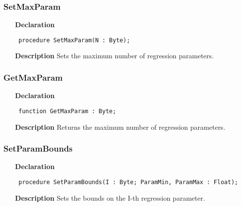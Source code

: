 \documentclass[12pt,a4paper,oneside]{report}
\newcommand{\declarationitem}[1]{\textbf{#1}}
\newcommand{\descriptiontitle}[1]{\textbf{#1}}
\newcommand{\code}[1]{\texttt{#1}}
\begin{document}
\subsubsection{SetMaxParam}
\label{unlfit-SetMaxParam}
\begin{itemize}\item[\declarationitem{Declaration}\hfill]
	\begin{flushleft}
		\code{
			procedure SetMaxParam(N : Byte);}
		
	\end{flushleft}
	
	\par
	\item[\descriptiontitle{Description}]
	Sets the maximum number of regression parameters.
	
\end{itemize}
\subsubsection{GetMaxParam}
\label{unlfit-GetMaxParam}
\begin{itemize}\item[\declarationitem{Declaration}\hfill]
	\begin{flushleft}
		\code{
			function GetMaxParam : Byte;}
		
	\end{flushleft}
	
	\par
	\item[\descriptiontitle{Description}]
	Returns the maximum number of regression parameters.
	
\end{itemize}
\subsubsection{SetParamBounds}
\label{unlfit-SetParamBounds}
\begin{itemize}\item[\declarationitem{Declaration}\hfill]
	\begin{flushleft}
		\code{
			procedure SetParamBounds(I : Byte; ParamMin, ParamMax : Float);}
		
	\end{flushleft}
	
	\par
	\item[\descriptiontitle{Description}]
	Sets the bounds on the I{-}th regression parameter.
	
\end{itemize}
\end{document}
